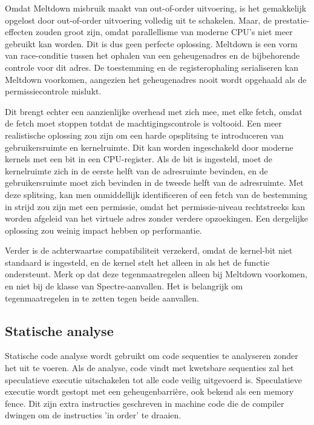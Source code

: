 Omdat Meltdown misbruik maakt van out-of-order uitvoering, is het gemakkelijk opgelost
door out-of-order uitvoering volledig uit te schakelen. Maar, de prestatie-effecten
zouden groot zijn, omdat parallellisme van moderne CPU's
niet meer gebruikt kan worden. Dit is dus geen perfecte
oplossing.
Meltdown is een vorm van race-conditie tussen het
ophalen van een geheugenadres en de bijbehorende controle voor dit adres. De toestemming en de registerophaling serialiseren
kan Meltdown voorkomen,
aangezien het geheugenadres nooit wordt opgehaald als de permissiecontrole mislukt.




Dit brengt echter een aanzienlijke overhead met zich mee,
met elke fetch, omdat de fetch moet stoppen
totdat de machtigingscontrole is voltooid.
Een meer realistische oplossing zou zijn om een harde opsplitsing te introduceren
van gebruikersruimte en kernelruimte. Dit kan worden ingeschakeld door moderne kernels met een
bit in een CPU-register. Als de
bit is ingesteld, moet de kernelruimte zich in de eerste helft 
van de adresruimte bevinden, en de gebruikersruimte moet zich bevinden in 
de tweede helft van de adresruimte. Met deze splitsing, kan men onmiddellijk identificeren of een
fetch van de bestemming in strijd zou zijn met een permissie,
omdat het permissie-niveau rechtstreeks kan worden afgeleid van
het virtuele adres zonder verdere opzoekingen. Een dergelijke oplossing zou weinig impact hebben op performantie.

Verder is de achterwaartse compatibiliteit
verzekerd, omdat de kernel-bit niet standaard is ingesteld, en
de kernel stelt het alleen in als het de functie ondersteunt.
Merk op dat deze tegenmaatregelen alleen bij Meltdown voorkomen,
en niet bij de klasse van Spectre-aanvallen. 
Het is belangrijk om tegenmaatregelen in te zetten
tegen beide aanvallen.




\subsection{Statische analyse}
Statische code analyse wordt gebruikt om code sequenties te analyseren zonder het uit te voeren. Als de analyse, code vindt met kwetsbare sequenties zal het speculatieve executie uitschakelen tot alle code veilig uitgevoerd is.
Speculatieve executie wordt gestopt met een geheugenbarrière, ook bekend als een memory fence. Dit zijn extra instructies geschreven in machine code die de compiler dwingen om de instructies 'in order' te draaien.



